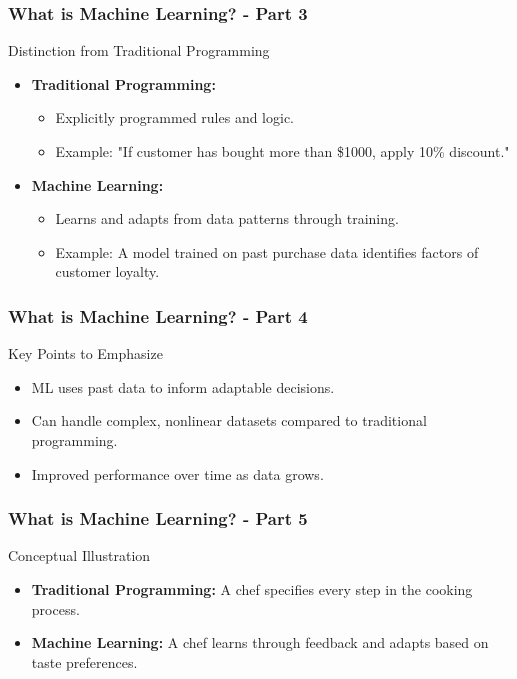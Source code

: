 \documentclass{beamer}
\begin{document}
\begin{frame}[fragile]
    \frametitle{What is Machine Learning? - Part 3}
    \begin{block}{Distinction from Traditional Programming}
        \begin{itemize}
            \item \textbf{Traditional Programming:}
            \begin{itemize}
                \item Explicitly programmed rules and logic.
                \item Example: "If customer has bought more than \$1000, apply 10\% discount."
            \end{itemize}

            \item \textbf{Machine Learning:}
            \begin{itemize}
                \item Learns and adapts from data patterns through training.
                \item Example: A model trained on past purchase data identifies factors of customer loyalty.
            \end{itemize}
        \end{itemize}
    \end{block}
\end{frame}

\begin{frame}[fragile]
    \frametitle{What is Machine Learning? - Part 4}
    \begin{block}{Key Points to Emphasize}
        \begin{itemize}
            \item ML uses past data to inform adaptable decisions.
            \item Can handle complex, nonlinear datasets compared to traditional programming.
            \item Improved performance over time as data grows.
        \end{itemize}
    \end{block}
\end{frame}

\begin{frame}[fragile]
    \frametitle{What is Machine Learning? - Part 5}
    \begin{block}{Conceptual Illustration}
        \begin{itemize}
            \item \textbf{Traditional Programming:} A chef specifies every step in the cooking process.
            \item \textbf{Machine Learning:} A chef learns through feedback and adapts based on taste preferences.
        \end{itemize}
    \end{block}
\end{frame}
\end{document}
